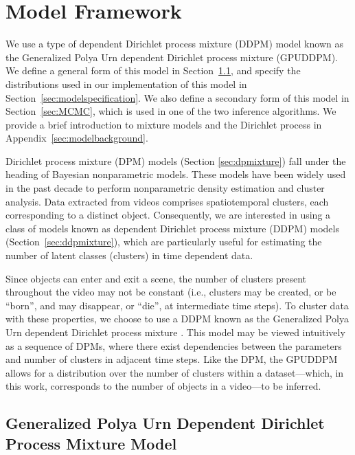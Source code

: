 \documentclass[twocolumn, final]{svjour3}
\begin{document}

\section{Model Framework}
\label{sec:modeldefinition}

We use a type of dependent Dirichlet process mixture (DDPM) model known as the Generalized Polya Urn dependent Dirichlet process mixture (GPUDDPM). We define a general form of this model in Section~\ref{sec:gpuddpm}, and specify the distributions used in our implementation of this model in Section~\ref{sec:modelspecification}. We also define a secondary form of this model in Section~\ref{sec:MCMC}, which is used in one of the two inference algorithms. We provide a brief introduction to mixture models and the Dirichlet process in Appendix~\ref{sec:modelbackground}.

Dirichlet process mixture (DPM) models (Section \ref{sec:dpmixture}) fall under the heading of Bayesian nonparametric models. These models have been widely used in the past decade to perform nonparametric density estimation and cluster analysis. Data extracted from videos comprises spatiotemporal clusters, each corresponding to a distinct object. Consequently, we are interested in using a class of models known as dependent Dirichlet process mixture (DDPM) models (Section~\ref{sec:ddpmixture}), which are particularly useful for estimating the number of latent classes (clusters) in time dependent data.

Since objects can enter and exit a scene, the number of clusters present throughout the video may not be constant (i.e., clusters may be created, or be ``born'', and may disappear, or ``die'', at intermediate time steps). To cluster data with these properties, we choose to use a DDPM known as the Generalized Polya Urn dependent Dirichlet process mixture \cite{caron_2007}. This model may be viewed intuitively as a sequence of DPMs, where there exist dependencies between the parameters and number of clusters in adjacent time steps. Like the DPM, the GPUDDPM allows for a distribution over the number of clusters within a dataset---which, in this work, corresponds to the number of objects in a video---to be inferred.



\subsection{Generalized Polya Urn Dependent Dirichlet Process Mixture Model}
\label{sec:gpuddpm}
\end{document}
